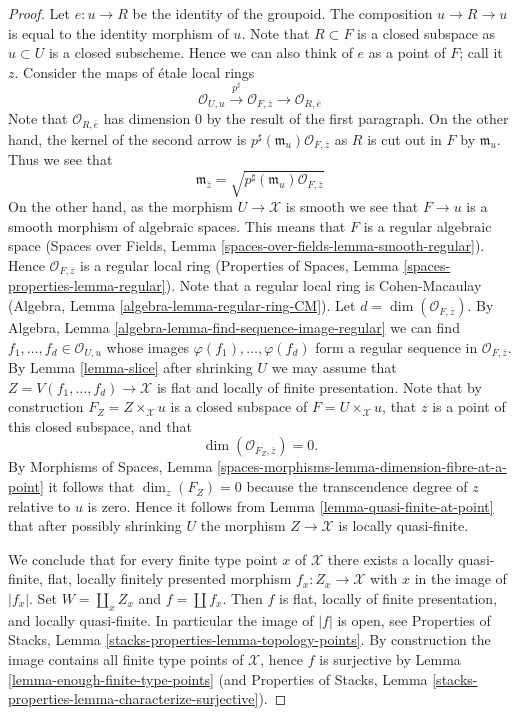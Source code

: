 \begin{proof}
\medskip\noindent
Let $e : u \to R$ be the identity of the groupoid. The composition
$u \to R \to u$ is equal to the identity morphism of $u$.
Note that $R \subset F$ is a closed
subspace as $u \subset U$ is a closed subscheme. Hence we can also think
of $e$ as a point of $F$; call it $z$.
Consider the maps of \'etale local rings
$$
\mathcal{O}_{U, u}
\xrightarrow{p^\sharp}
\mathcal{O}_{F, \overline{z}}
\longrightarrow
\mathcal{O}_{R, \overline{e}}
$$
Note that $\mathcal{O}_{R, \overline{e}}$ has dimension $0$ by the result
of the first paragraph. On the other hand, the kernel of the second arrow is
$p^\sharp(\mathfrak m_u)\mathcal{O}_{F, \overline{z}}$ as
$R$ is cut out in $F$ by $\mathfrak m_u$. Thus we see that
$$
\mathfrak m_{\overline{z}} =
\sqrt{p^\sharp(\mathfrak m_u)\mathcal{O}_{F, \overline{z}}}
$$
On the other hand, as the morphism $U \to \mathcal{X}$ is smooth
we see that $F \to u$ is a smooth morphism of algebraic spaces.
This means that $F$ is a regular algebraic space
(Spaces over Fields, Lemma \ref{spaces-over-fields-lemma-smooth-regular}).
Hence $\mathcal{O}_{F, \overline{z}}$ is a regular local ring
(Properties of Spaces, Lemma \ref{spaces-properties-lemma-regular}).
Note that a regular local ring is Cohen-Macaulay
(Algebra, Lemma \ref{algebra-lemma-regular-ring-CM}).
Let $d = \dim(\mathcal{O}_{F, \overline{z}})$. By
Algebra, Lemma \ref{algebra-lemma-find-sequence-image-regular}
we can find $f_1, \ldots, f_d \in \mathcal{O}_{U, u}$ whose images
$\varphi(f_1), \ldots, \varphi(f_d)$ form a regular sequence
in $\mathcal{O}_{F, \overline{z}}$. By
Lemma \ref{lemma-slice}
after shrinking $U$ we may assume that
$Z = V(f_1, \ldots, f_d) \to \mathcal{X}$ is flat and
locally of finite presentation. Note that by construction
$F_Z = Z \times_\mathcal{X} u$ is a closed subspace of
$F = U \times_\mathcal{X} u$, that $z$ is a point of this closed subspace,
and that
$$
\dim(\mathcal{O}_{F_Z, \overline{z}}) = 0.
$$
By
Morphisms of Spaces,
Lemma \ref{spaces-morphisms-lemma-dimension-fibre-at-a-point}
it follows that $\dim_z(F_Z) = 0$ because the transcendence degree
of $z$ relative to $u$ is zero. Hence it follows from
Lemma \ref{lemma-quasi-finite-at-point}
that after possibly shrinking $U$ the morphism $Z \to \mathcal{X}$
is locally quasi-finite.

\medskip\noindent
We conclude that for every finite type point $x$ of $\mathcal{X}$ there
exists a locally quasi-finite, flat, locally finitely presented
morphism $f_x : Z_x \to \mathcal{X}$ with $x$ in the image of $|f_x|$.
Set $W = \coprod_x Z_x$ and $f = \coprod f_x$. Then $f$ is flat, locally
of finite presentation, and locally quasi-finite. In particular the
image of $|f|$ is open, see
Properties of Stacks, Lemma \ref{stacks-properties-lemma-topology-points}.
By construction the image contains all finite type points of $\mathcal{X}$,
hence $f$ is surjective by
Lemma \ref{lemma-enough-finite-type-points} (and
Properties of Stacks, Lemma
\ref{stacks-properties-lemma-characterize-surjective}).
\end{proof}

